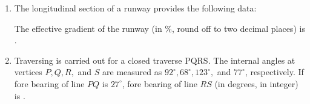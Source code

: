 \documentclass[journal]{IEEEtran}
\numberwithin{equation}{enumi}
\numberwithin{figure}{enumi}
\begin{document}
\begin{enumerate}
\bigskip

\item 
The longitudinal section of a runway provides the following data:

\begin{table}[!ht]    
  \centering
  
\end{table}

The effective gradient of the runway (in \%, round off to two decimal places) is \underline{\hspace{2cm}}.

\bigskip

\item 
Traversing is carried out for a closed traverse PQRS. The internal angles at vertices $P, Q, R,$ and $S$ are measured as $92^\circ, 68^\circ, 123^\circ,$ and $77^\circ$, respectively. If fore bearing of line $PQ$ is $27^\circ$, fore bearing of line $RS$ (in degrees, in integer) is \underline{\hspace{2cm}}.

\end{enumerate}
\end{document}
